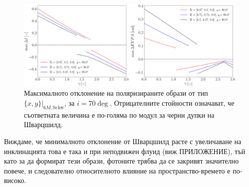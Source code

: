 \begin{figure}[!htb]
	\hspace{-0.5cm}
	\includegraphics[scale = 0.22]{WH_70_deg_param_sweep.png}
	\caption[Максималното отклонение на поляризираните образи от тип $\{x,y\}\vert_{6M, \text{Schw}}$, за $i = 70\deg$]{Максималното отклонение на поляризираните образи от тип $\{x,y\}\vert_{6M, \text{Schw}}$, за $i = 70\deg$. Отрицателните стойности означават, че съответната величина е по-голяма по модул за черни дупки на Шварцшилд.} 
	\label{WH_max_deviation_70_deg}
\end{figure}

Виждаме, че минималното отклонение от Шварцшилд расте с увеличаване на инклинацията това е така и при неподвижен флуид (виж ПРИЛОЖЕНИЕ), тъй като за да формират тези образи, фотоните трябва да се закривят значително повече, и следователно относителното влияние на пространство-времето е по-високо.


